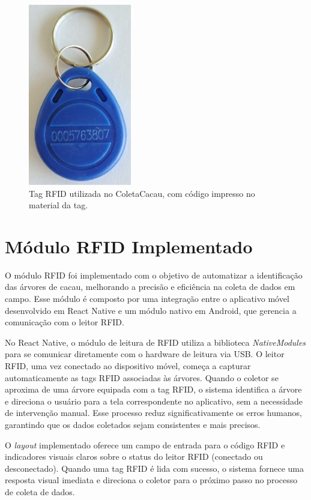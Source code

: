 \begin{figure}[H]
    \centering
    \includegraphics[width=0.4\textwidth]{images/rfid/tag.jpg}
    \caption{Tag RFID utilizada no ColetaCacau, com código impresso no material da tag.}
    \label{fig:RfidTag}
\end{figure}

\section{Módulo RFID Implementado}
O módulo RFID foi implementado com o objetivo de automatizar a identificação das árvores de cacau, melhorando a precisão e eficiência na coleta de dados em campo. Esse módulo é composto por uma integração entre o aplicativo móvel desenvolvido em React Native e um módulo nativo em Android, que gerencia a comunicação com o leitor RFID.

No React Native, o módulo de leitura de RFID utiliza a biblioteca \textit{NativeModules} para se comunicar diretamente com o hardware de leitura via USB. O leitor RFID, uma vez conectado ao dispositivo móvel, começa a capturar automaticamente as tags RFID associadas às árvores. Quando o coletor se aproxima de uma árvore equipada com a tag RFID, o sistema identifica a árvore e direciona o usuário para a tela correspondente no aplicativo, sem a necessidade de intervenção manual. Esse processo reduz significativamente os erros humanos, garantindo que os dados coletados sejam consistentes e mais precisos.

O \textit{layout} implementado oferece um campo de entrada para o código RFID e indicadores visuais claros sobre o status do leitor RFID (conectado ou desconectado). Quando uma tag RFID é lida com sucesso, o sistema fornece uma resposta visual imediata e direciona o coletor para o próximo passo no processo de coleta de dados.

